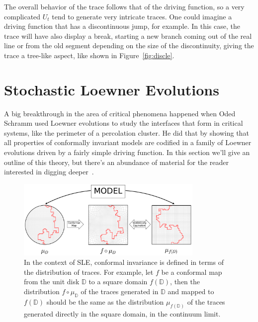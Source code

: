 The overall behavior of the trace follows that of the driving function, so a
very complicated $U_t$ tend to generate very intricate traces. One could
imagine a driving function that has a discontinuous jump, for example. In this
case, the trace will have also display a break, starting a new branch coming
out of the real line or from the old segment depending on the size of the
discontinuity, giving the trace a tree-like aspect, like shown in
Figure~\ref{fig:discle}.

\section{Stochastic Loewner Evolutions}
\label{sec:sle}

A big breakthrough in the area of critical phenomena happened when Oded Schramm
used Loewner evolutions to study the interfaces that form in critical systems,
like the perimeter of a percolation cluster. He did that by showing that all
properties of conformally invariant models are codified in a family of Loewner
evolutions driven by a fairly simple driving function. In this section we'll
give an outline of this theory, but there's an abundance of material for the
reader interested in digging deeper~\cite{Cardy2005, Kager2004, Henkel2012}.

\begin{figure}[b]
\begin{center}
    \includegraphics[width=0.8\textwidth]{chapters/ch4-sle/figs/sle_confinv}
\end{center}
\caption{In the context of SLE, conformal invariance is defined in terms of the
    distribution of traces. For example, let $f$ be a conformal map from the
    unit disk $\mathbb{D}$ to a square domain $f(\mathbb{D})$, then the
    distribution $f\circ\mu_\mathbb{D}$ of the traces generated in $\mathbb{D}$
    and mapped to $f(\mathbb{D})$ should be the same as the distribution
    $\mu_{f(\mathbb{D})}$ of the traces generated directly in the square
    domain, in the continuum limit.}
\label{fig:confinv}
\end{figure}

